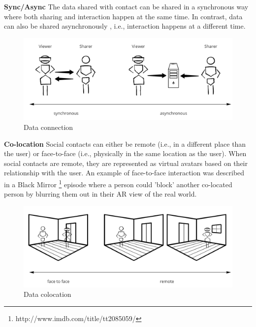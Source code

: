 
\textbf{Sync/Async}
The data shared with contact can be shared in a synchronous way where both sharing and interaction happen at the same time. In contrast, data can also be shared asynchronously \cite{Smith2016}, i.e., interaction happens at a different time. 

\begin{figure}[h]
    \centering
    \includegraphics[width=.8\linewidth]{images/continuum-connection.jpg}
    \caption{Data connection}
    \label{fig:continuum:data-connection}
\end{figure}

\textbf{Co-location}
Social contacts can either be remote (i.e., in a different place than the user) or face-to-face (i.e., physically in the same location as the user). When social contacts are remote, they are represented as virtual avatars based on their relationship with the user. An example of face-to-face interaction was described in a Black Mirror \footnote{http://www.imdb.com/title/tt2085059/} episode where a person could 'block' another co-located person by blurring them out in their AR view of the real world.

\begin{figure}[h]
    \centering
    \includegraphics[width=.8\linewidth]{images/continuum-colocation.jpg}
    \caption{Data colocation}
    \label{fig:continuum:data-colocation}
\end{figure}


